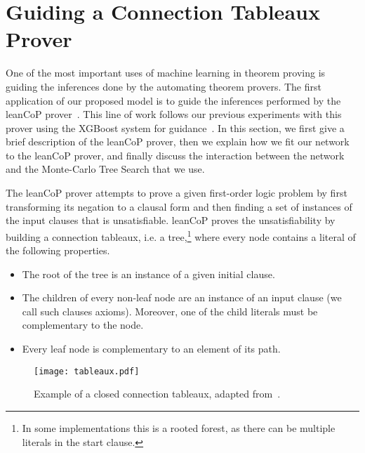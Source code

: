 \documentclass{ecai}
\def\systemname#1{\textsf{#1}\xspace}
\newcommand{\lc}{\systemname{leanCoP}}
\newcommand{\nbc}[3]{
                {\colorbox{#3}{\bfseries\sffamily\scriptsize\textcolor{white}{#1}}}
                {\textcolor{#3}{\sffamily\small$\blacktriangleright$\textit{#2}$\blacktriangleleft$}}
}
\newcommand{\todoat}[2]{\nbc{TODO: #1}{#2}{todocolor}}
\begin{document}
\section{Guiding a Connection Tableaux Prover}
\label{leancop-example}

One of the most important %
uses
of machine learning in theorem
proving is guiding the inferences %
done by
the automating theorem
provers. The first application of our proposed model is to guide the
inferences performed by the \lc prover~\cite{OB03}. This line of work
follows our previous experiments with this prover using the XGBoost system
for guidance~\cite{KaliszykUMO18}. In this section, we first give a
brief description of the
\lc prover, then we explain how we fit our network to the \lc prover, and
finally discuss the interaction between the network and the Monte-Carlo
Tree Search that we use.

The \lc prover attempts to prove a given first-order logic problem by first
transforming its negation to a clausal form and then finding a set of instances of
the input clauses that is unsatisfiable. \lc proves the
unsatisfiability by building a connection tableaux, i.e. a tree,\footnote{In some implementations
this is a rooted forest, as there can be multiple literals in the start clause.}
where
every node contains a literal of the following properties.
\begin{itemize}
  \item The root of the tree is an instance of a given initial clause.
  \item The children of every non-leaf node are an instance of an input clause
    (we call such clauses
    axioms). Moreover, one of the child literals must be complementary
    to the node.
  \item Every leaf node is complementary to an element of its path.
\end{itemize}

\begin{figure}
  \texttt{[image: tableaux.pdf]}
\caption{Example of a closed connection tableaux, adapted from~\cite{Letz1994ControlledIO}.}\label{tableaux}
\end{figure}
\end{document}
